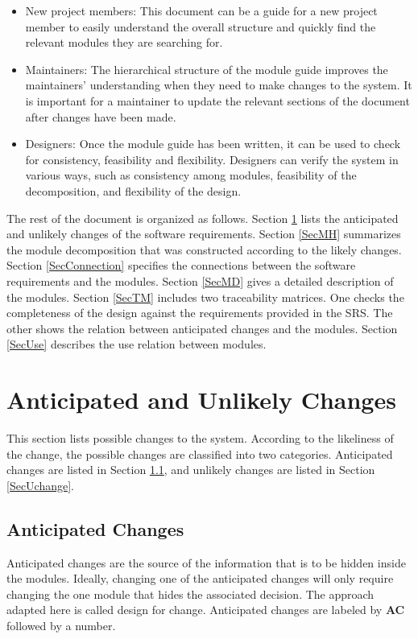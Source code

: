 \documentclass[12pt, titlepage]{article}
\begin{document}
\begin{itemize}
\item New project members: This document can be a guide for a new project member
  to easily understand the overall structure and quickly find the
  relevant modules they are searching for.
\item Maintainers: The hierarchical structure of the module guide improves the
  maintainers' understanding when they need to make changes to the system. It is
  important for a maintainer to update the relevant sections of the document
  after changes have been made.
\item Designers: Once the module guide has been written, it can be used to
  check for consistency, feasibility and flexibility. Designers can verify the
  system in various ways, such as consistency among modules, feasibility of the
  decomposition, and flexibility of the design.
\end{itemize}

The rest of the document is organized as follows. Section
\ref{SecChange} lists the anticipated and unlikely changes of the software
requirements. Section \ref{SecMH} summarizes the module decomposition that
was constructed according to the likely changes. Section \ref{SecConnection}
specifies the connections between the software requirements and the
modules. Section \ref{SecMD} gives a detailed description of the
modules. Section \ref{SecTM} includes two traceability matrices. One checks
the completeness of the design against the requirements provided in the SRS. The
other shows the relation between anticipated changes and the modules. Section
\ref{SecUse} describes the use relation between modules.

\section{Anticipated and Unlikely Changes} \label{SecChange}

This section lists possible changes to the system. According to the likeliness
of the change, the possible changes are classified into two
categories. Anticipated changes are listed in Section \ref{SecAchange}, and
unlikely changes are listed in Section \ref{SecUchange}.

\subsection{Anticipated Changes} \label{SecAchange}

Anticipated changes are the source of the information that is to be hidden
inside the modules. Ideally, changing one of the anticipated changes will only
require changing the one module that hides the associated decision. The approach
adapted here is called design for change. Anticipated changes are labeled by
{\bf AC} followed by a number.
\end{document}

